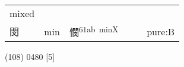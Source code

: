 \documentclass[14pt,a4paper]{scrartcl}
\begin{document}
\begin{longtable}[c]{@{}llllll@{}}
\begin{minipage}[t]{0.14\columnwidth}
mixed
\strut\end{minipage}\tabularnewline
\begin{minipage}[t]{0.14\columnwidth}\raggedright\strut
閔
\strut\end{minipage} &
\begin{minipage}[t]{0.14\columnwidth}\raggedright\strut
min
\strut\end{minipage} &
\begin{minipage}[t]{0.14\columnwidth}\raggedright\strut
憫\textsuperscript{61ab~minX}
\strut\end{minipage} &
\begin{minipage}[t]{0.14\columnwidth}\raggedright\strut
\strut\end{minipage} &
\begin{minipage}[t]{0.14\columnwidth}\raggedright\strut
\strut\end{minipage} &
\begin{minipage}[t]{0.14\columnwidth}\raggedright\strut
pure:B
\strut\end{minipage}\tabularnewline
\bottomrule
\end{longtable}

(108) 0480 {[}5{]}
\end{document}
